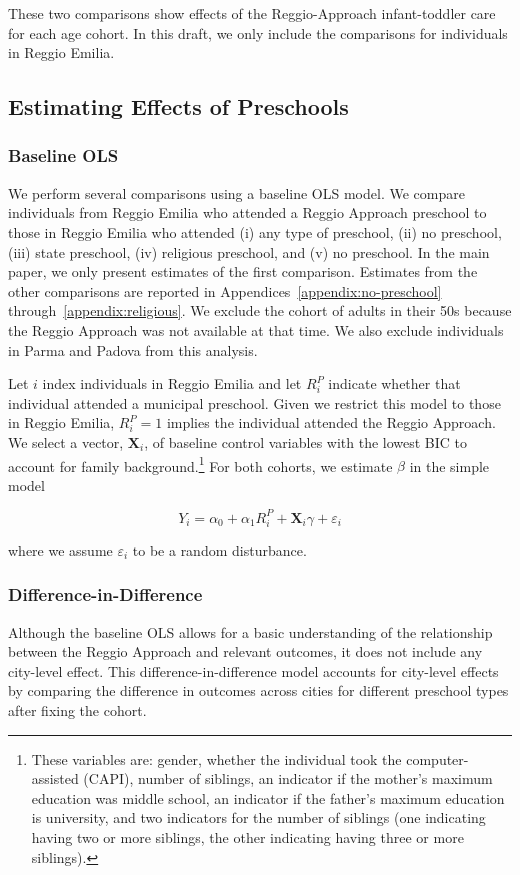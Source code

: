 These two comparisons show effects of the Reggio-Approach infant-toddler care for each age cohort. In this draft, we only include the comparisons for individuals in Reggio Emilia. 

\subsection{Estimating Effects of Preschools}
\subsubsection{Baseline OLS}
We perform several comparisons using a baseline OLS model. We compare individuals from Reggio Emilia who attended a Reggio Approach preschool to those in Reggio Emilia who attended (i) any type of preschool, (ii) no preschool, (iii) state preschool, (iv) religious preschool, and (v) no preschool. In the main paper, we only present estimates of the first comparison. Estimates from the other comparisons are reported in Appendices~\ref{appendix:no-preschool} through~\ref{appendix:religious}. We exclude the cohort of adults in their 50s because the Reggio Approach was not available at that time. We also exclude individuals in Parma and Padova from this analysis.

Let $i$ index individuals in Reggio Emilia and let $R_i^{P}$ indicate whether that individual attended a municipal preschool. Given we restrict this model to those in Reggio Emilia, $R_i^{P} = 1$ implies the individual attended the Reggio Approach. We select a vector, $\bm{X}_i$, of baseline control variables with the lowest BIC to account for family background.\footnote{These variables are: gender, whether the individual took the computer-assisted (CAPI), number of siblings, an indicator if the mother's maximum education was middle school, an indicator if the father's maximum education is university, and two indicators for the number of siblings (one indicating having two or more siblings, the other indicating having three or more siblings).} For both cohorts, we estimate $\beta$ in the simple model

\begin{equation}
	Y_i = \alpha_0 + \alpha_1 R_i^{P} + \bm{X}_i\gamma + \varepsilon_i
	\label{eq:ra-v-none}
\end{equation}

\noindent where we assume $\varepsilon_i$ to be a random disturbance. 

\subsubsection{Difference-in-Difference}
Although the baseline OLS allows for a basic understanding of the relationship between the Reggio Approach and relevant outcomes, it does not include any city-level effect. This difference-in-difference model accounts for city-level effects by comparing the difference in outcomes across cities for different preschool types after fixing the cohort. 

